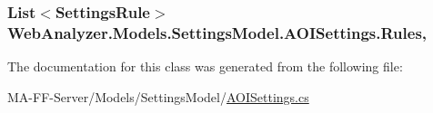 \subsubsection[{Rules}]{\setlength{\rightskip}{0pt plus 5cm}List$<${\bf Settings\+Rule}$>$ Web\+Analyzer.\+Models.\+Settings\+Model.\+A\+O\+I\+Settings.\+Rules\hspace{0.3cm}{\ttfamily [get]}, {\ttfamily [set]}}\label{class_web_analyzer_1_1_models_1_1_settings_model_1_1_a_o_i_settings_a8852191a79accfc1288d0fb6a2b4a14c}


The documentation for this class was generated from the following file\+:\begin{DoxyCompactItemize}
\item 
M\+A-\/\+F\+F-\/\+Server/\+Models/\+Settings\+Model/\hyperlink{_a_o_i_settings_8cs}{A\+O\+I\+Settings.\+cs}\end{DoxyCompactItemize}
